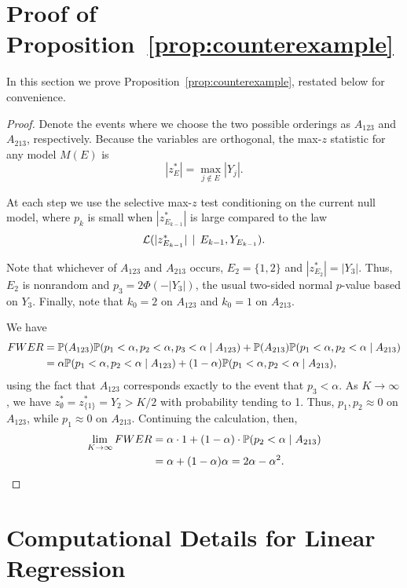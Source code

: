 \documentclass{article}
\begin{document}
\begin{appendix}

\section{Proof of Proposition~\ref{prop:counterexample}}

In this section we prove Proposition~\ref{prop:counterexample}, restated below for convenience.

\counterex*

\begin{proof}
Denote the events where we choose the two possible orderings as $A_{123}$ and $A_{213}$, respectively. Because the variables are orthogonal, the max-$z$ statistic for any model $M(E)$ is 
\[
|z_E^*|=\max_{j\notin E} |Y_j|.
\]

At each step we use the selective max-$z$ test conditioning on the current null model, where $p_k$ is small when $|z_{E_{k-1}}^*|$ is large compared to the law
\[
\cL(|z_{E_{k-1}}^*| \,\mid\, E_{k-1}, Y_{E_{k-1}}).
\]

Note that whichever of $A_{123}$ and $A_{213}$ occurs, $E_2=\{1,2\}$ and $|z_{E_2}^*|=|Y_3|$. Thus, $E_2$ is nonrandom and $p_3=2\Phi(-|Y_3|)$, the usual two-sided normal $p$-value based on $Y_3$. Finally, note that $k_0=2$ on $A_{123}$ and $k_0=1$ on $A_{213}$. 

We have
\begin{align*}
  FWER 
  &= \P(A_{123})\P(p_1<\alpha, p_2<\alpha, p_3<\alpha \mid A_{123})
  + \P(A_{213})\P(p_1<\alpha, p_2<\alpha \mid A_{213})\\
  &= \alpha \P(p_1<\alpha, p_2<\alpha \mid A_{123})
  + (1-\alpha) \P(p_1<\alpha, p_2<\alpha \mid A_{213}),
\end{align*}
using the fact that $A_{123}$ corresponds exactly to the event that $p_3<\alpha$. As $K\to\infty$, we have $z_\emptyset^*=z_{\{1\}}^*=Y_2>K/2$ with probability tending to 1. Thus, $p_1,p_2\approx 0$ on $A_{123}$, while $p_1\approx 0$ on $A_{213}$. Continuing the calculation, then,
\begin{align*}
  \lim_{K\to\infty} FWER 
  &= \alpha\cdot 1 + (1-\alpha)\cdot \P(p_2 < \alpha \mid A_{213})\\
  &= \alpha + (1-\alpha)\alpha = 2\alpha-\alpha^2.
\end{align*}
\end{proof}


\section{Computational Details for Linear Regression}\label{sec:linRegComputation}


\end{appendix}
\end{document}
